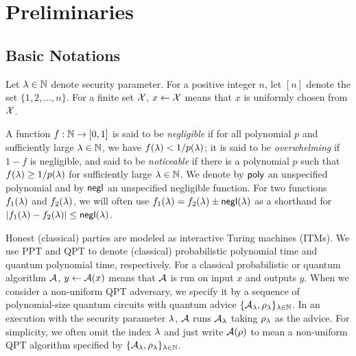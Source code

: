 
\section{Preliminaries}

\subsection{Basic Notations} 
Let $\lambda \in \mathbb{N}$ denote security parameter. 
For a positive integer $n$, let $[n]$ denote the set $\{1,2,...,n\}$.
For a finite set $\mathcal{X}$, $x\gets \mathcal{X}$ means that $x$ is uniformly chosen from $\mathcal{X}$.

A function $f:\mathbb{N}\rightarrow [0,1]$ is said to be \emph{negligible} if for all polynomial $p$ and sufficiently large $\lambda \in \mathbb{N}$, we have $f(\lambda)< 1/p(\lambda)$; it is said to be \emph{overwhelming} if $1-f$ is negligible, and said to be \emph{noticeable} if there is a polynomial $p$ such that $f(\lambda)\geq  1/p(\lambda)$ for sufficiently large $\lambda\in \mathbb{N}$. We denote by $\mathsf{poly}$ an unspecified polynomial and by $\mathsf{negl}$ an unspecified negligible function. For two functions $f_1(\lambda)$ and $f_2(\lambda)$, we will often use $f_1(\lambda) = f_2(\lambda) \pm \mathsf{negl}(\lambda)$ as a shorthand for $|f_1(\lambda) - f_2(\lambda)| \le  \mathsf{negl}(\lambda)$.

Honest (classical) parties are modeled as interactive Turing machines (ITMs). We use PPT and QPT to denote (classical) probabilistic polynomial time and quantum polynomial time, respectively.
For a classical probabilistic or quantum algorithm $\mathcal{A}$, $y\gets \mathcal{A}(x)$ means that $\mathcal{A}$ is run on input $x$ and outputs $y$. When we consider a non-uniform QPT adversary, we specify it by a sequence of polynomial-size quantum circuits with quantum advice $\{\mathcal{A}_\lambda, \rho_\lambda\}_{\lambda\in\mathbb{N}}$. In an execution with the security parameter $\lambda$, $\mathcal{A}$ runs $\mathcal{A}_{\lambda}$ taking $\rho_\lambda$ as the advice.  
For simplicity, we often omit the index $\lambda$ and just write $\mathcal{A}(\rho)$ to mean a non-uniform QPT algorithm specified by  $\{\mathcal{A}_\lambda, \rho_\lambda\}_{\lambda\in \mathbb{N}}$.

